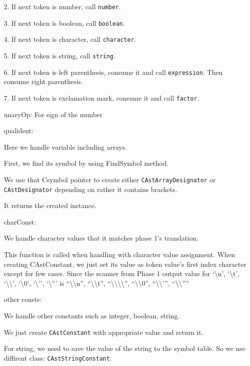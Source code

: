 \documentclass[12pt]{article}
\begin{document}
\begin{MyIndentedList}
\begin{MyIndentedList}
        \item 2. If next token is number, call \texttt{number}.
        \item 3. If next token is boolean, call \texttt{boolean}.
        \item 4. If next token is character, call \texttt{character}.
        \item 5. If next token is string, call \texttt{string}.
        \item 6. If next token is left parenthesis, consume it and call \texttt{expression}. Then consume right parenthesis.
        \item 7. If next token is exclamation mark, consume it and call \texttt{factor}.
    \end{MyIndentedList}
    \item unaryOp: For sign of the number
    \item qualident:
        \begin{MyIndentedList}
            \item Here we handle variable including arrays.
            \item First, we find its symbol by using FindSymbol method.
            \item We use that Csymbol pointer to create either \texttt{CAstArrayDesignator} or \texttt{CAstDesignator} depending on rather it contains brackets.
            \item It returns the created instance. 
        \end{MyIndentedList}
    \item charConst:
    \begin{MyIndentedList}
        \item We handle character values that it matches phase 1’s translation. 
        \item This function is called when handling with character value assignment. When creating CAstConstant, we just set its value as token value’s first index character except for few cases. 
        Since the scanner from Phase 1 output value for ‘\textbackslash n’, ‘\textbackslash t’, ‘\textbackslash\textbackslash’, ‘\textbackslash 0’, ‘\textbackslash ’’, ‘\textbackslash ”’ is
        “\textbackslash\textbackslash n”, “\textbackslash\textbackslash t”, “\textbackslash\textbackslash\textbackslash\textbackslash”, “\textbackslash\textbackslash 0”, “\textbackslash\textbackslash ’”, “\textbackslash\textbackslash ””
    \end{MyIndentedList}
    \item other consts:
    \begin{MyIndentedList}
        \item We handle other constants such as integer, boolean, string.
        \item We just create \texttt{CAstConstant} with appropriate value and return it.
        \item For string, we need to save the value of the string to the symbol table. So we use diffirent class: \texttt{CAstStringConstant}.
    \end{MyIndentedList}
\end{MyIndentedList}
\end{document}
